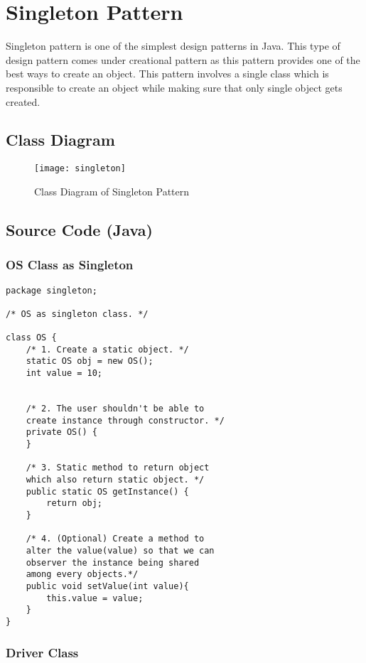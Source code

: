 \section{Singleton Pattern}

Singleton pattern is one of the simplest design patterns in Java. This type of design pattern comes under creational pattern as this pattern provides one of the best ways to create an object. This pattern involves a single class which is responsible to create an object while making sure that only single object gets created.

\subsection{Class Diagram}

\begin{figure}[h]
\centering
\texttt{[image: singleton]}
\caption{Class Diagram of Singleton Pattern}
\end{figure}

\newpage
\subsection{Source Code (Java)}

\subsubsection{OS Class as Singleton}

\begin{verbatim}
package singleton;

/* OS as singleton class. */

class OS {
    /* 1. Create a static object. */
    static OS obj = new OS();
    int value = 10;


    /* 2. The user shouldn't be able to 
    create instance through constructor. */
    private OS() {
    }

    /* 3. Static method to return object 
    which also return static object. */
    public static OS getInstance() {
        return obj;
    }

    /* 4. (Optional) Create a method to 
    alter the value(value) so that we can
    observer the instance being shared
    among every objects.*/
    public void setValue(int value){
        this.value = value;
    }
}
\end{verbatim}

\subsubsection{Driver Class}

